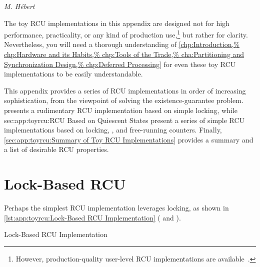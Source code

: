 
%
	 {\emph{M. H\'ebert}}

The toy RCU implementations in this appendix are designed not for
high performance, practicality, or any kind of production use,\footnote{
	However, production-quality user-level RCU implementations
	are available~\cite{MathieuDesnoyers2009URCU,MathieuDesnoyers2012URCU}.}
but rather for clarity.
Nevertheless, you will need a thorough understanding of
\cref{chp:Introduction,%
chp:Hardware and its Habits,%
chp:Tools of the Trade,%
cha:Partitioning and Synchronization Design,%
chp:Deferred Processing}
for even these toy RCU implementations to be easily understandable.

This appendix provides a series of RCU implementations in order of
increasing sophistication, from the viewpoint of solving the
existence-guarantee problem.
 presents a rudimentary
RCU implementation based on simple locking, while
{sec:app:toyrcu:RCU Based on Quiescent States}
present a series of
simple RCU implementations based on locking, ,
and free-running counters.
Finally, \cref{sec:app:toyrcu:Summary of Toy RCU Implementations}
provides a summary and a list of desirable RCU properties.

\section{Lock-Based RCU}
\label{sec:app:toyrcu:Lock-Based RCU}

Perhaps the simplest RCU implementation leverages locking, as
shown in
\cref{lst:app:toyrcu:Lock-Based RCU Implementation}
( and ).

\begin{listing}
\vspace*{-11pt}
\caption{Lock-Based RCU Implementation}
\label{lst:app:toyrcu:Lock-Based RCU Implementation}
\end{listing}

